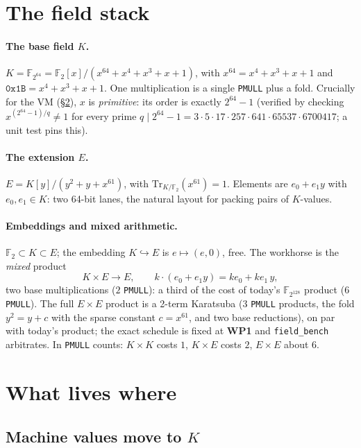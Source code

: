 \documentclass[11pt]{article}
\newcommand{\F}{\mathbb{F}}
\newcommand{\K}{K}            %
\newcommand{\E}{E}            %
\newcommand{\WP}[1]{\textbf{WP#1}}
\begin{document}
\section{The field stack}\label{sec:fields}

\paragraph{The base field $\K$.}
$\K=\F_{2^{64}}=\F_2[x]/(x^{64}+x^4+x^3+x+1)$, with
$x^{64}=x^4+x^3+x+1$ and $\mathtt{0x1B}=x^4+x^3+x+1$. One
multiplication is a single \texttt{PMULL} plus a fold. Crucially for the VM
(\S\ref{sec:vm-transport}), $x$ is \emph{primitive}: its order is exactly
$2^{64}-1$ (verified by checking $x^{(2^{64}-1)/q}\neq 1$ for every prime
$q\mid 2^{64}-1=3\cdot5\cdot17\cdot257\cdot641\cdot65537\cdot6700417$; a
unit test pins this).

\paragraph{The extension $\E$.}
$\E=\K[y]/(y^2+y+x^{61})$, with
$\mathrm{Tr}_{\K/\F_2}(x^{61})=1$. Elements are $e_0+e_1y$ with
$e_0,e_1\in\K$: two 64-bit lanes, the natural layout for packing pairs of
$\K$-values.

\paragraph{Embeddings and mixed arithmetic.}
$\F_2\subset\K\subset\E$; the embedding $\K\hookrightarrow\E$ is
$e\mapsto(e,0)$, free. The workhorse is the \emph{mixed} product
\[
  \K\times\E\to\E,\qquad k\cdot(e_0+e_1y)=ke_0+ke_1\,y,
\]
two base multiplications ($2$ \texttt{PMULL}): a third of the cost of
today's $\F_{2^{128}}$ product ($6$ \texttt{PMULL}). The full
$\E\times\E$ product is a 2-term Karatsuba ($3$ \texttt{PMULL} products,
the fold $y^2=y+c$ with the sparse constant $c=x^{61}$, and two base
reductions), on par with today's product; the exact schedule is fixed at
\WP1 and \texttt{field\_bench} arbitrates. In \texttt{PMULL} counts:
$\K\times\K$ costs $1$, $\K\times\E$ costs $2$, $\E\times\E$ about $6$.

\section{What lives where}\label{sec:vm-transport}

\subsection{Machine values move to $\K$}
\end{document}
